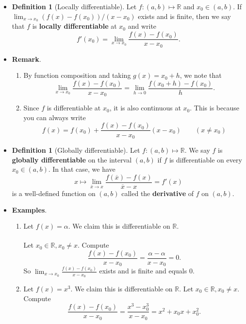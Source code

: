 \documentclass{article}
\newcommand{\R}{\mathbb{R}}
\newcommand{\?}{\stackrel{?}{=}}
\theoremstyle{definition} %
\newtheorem{definition}[subsection]{Definition} %
\begin{document}
\begin{itemize}
    \item[]
    \begin{definition}[Locally differentiable]
        Let $f: (a, b) \mapsto \R$ and $x_0 \in (a, b)$. If $\lim_{x \to x_0} (f(x) - f(x_0))/(x - x_0)$ exists and is finite, then we say that $f$ is \textbf{locally differentiable} at $x_0$ and write
        $$f'(x_0) = \lim_{x \to x_0} \frac{f(x) - f(x_0)}{x - x_0}.$$
    \end{definition}
    \item \textbf{Remark}.
    \begin{enumerate}[label=(\arabic*)]
        \item By function composition and taking $g(x) = x_0 + h$, we note that
        $$\lim_{x \to x_0} \frac{f(x) - f(x_0)}{x - x_0} = \lim_{h \to 0} \frac{f(x_0 + h) - f(x_0)}{h}.$$
        \item Since $f$ is differentiable at $x_0$, it is also continuous at $x_0$. This is because you can always write
        $$f(x) = f(x_0) + \frac{f(x) - f(x_0)}{x - x_0} (x - x_0) \qquad (x \neq x_0)$$
    \end{enumerate}
    \item[]
    \begin{definition}[Globally differentiable]
        Let $f: (a, b) \mapsto \R$. We say $f$ is \textbf{globally differentiable} on the interval $(a, b)$ if $f$ is differentiable on every $x_0 \in (a, b)$. In that case, we have
        $$x \mapsto \lim_{\overline{x} \to x} \frac{f(\overline{x}) - f(x)}{\overline{x} - x} = f'(x)$$
        is a well-defined function on $(a, b)$ called the \textbf{derivative} of $f$ on $(a, b)$.
    \end{definition}
    \item \textbf{Examples}.
    \begin{enumerate}[label=(\arabic*)]
        \item Let $f(x) = \alpha$. We claim this is differentiable on $\R$. \\\\
        Let $x_0 \in \R, x_0 \neq x$. Compute
        $$\frac{f(x) - f(x_0)}{x - x_0} = \frac{\alpha - \alpha}{x - x_0} = 0.$$
        So $\lim_{x \to x_0} \frac{f(x) - f(x_0)}{x - x_0}$ exists and is finite and equals 0.
        \item Let $f(x) = x^3$. We claim this is differentiable on $\R$. Let $x_0 \in \R, x_0 \neq x$. Compute
        $$\frac{f(x) - f(x_0)}{x - x_0} = \frac{x^3 - x_0^3}{x - x_0} = x^2 + x_0x + x_0^2.$$

\end{enumerate}
\end{itemize}
\end{document}
